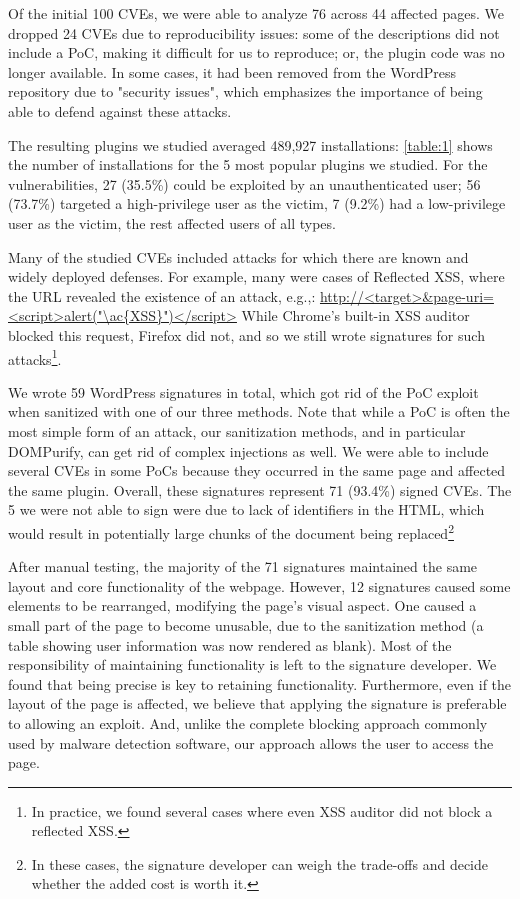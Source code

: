 Of the initial 100 CVEs, we were able to analyze 76 across 44 affected
pages. We dropped 24 CVEs due to reproducibility issues: some of the
descriptions did not include a PoC, making it difficult for us to
reproduce; or, the plugin code was no longer available. In some cases,
it had been removed from the WordPress repository due to "security
issues", which emphasizes the importance of being able to defend
against these attacks. %

The resulting plugins we studied averaged 489,927
installations: \autoref{table:1} shows the number of installations for
the 5 most popular plugins we studied. For the vulnerabilities, 27
(35.5\%) could be exploited by an unauthenticated user; 56 (73.7\%)
targeted a high-privilege user as the victim, 7 (9.2\%) had a
low-privilege user as the victim, the rest affected users of all
types.

Many of the studied CVEs included attacks for which there are known
and widely deployed defenses. For example, many were cases of
Reflected \ac{XSS}, where the URL revealed the existence of an attack,
e.g.,: \url{http://<target>&page-uri=<script>alert("\ac{XSS}")</script>}
While Chrome's built-in \ac{XSS} auditor blocked this request, Firefox
did not, and so we still wrote signatures for such attacks\footnote{In
practice, we found several cases where even XSS auditor did not block
a reflected XSS.}.

We wrote 59 WordPress signatures in total, which got rid of the PoC
exploit when sanitized with one of our three methods. Note that while
a PoC is often the most simple form of an attack, our sanitization
methods, and in particular DOMPurify, can get rid of complex
injections as well. We were able to include several CVEs in some PoCs
because they occurred in the same page and affected the same
plugin. Overall, these signatures represent 71 (93.4\%) signed
CVEs. The 5 we were not able to sign were due to lack of identifiers
in the HTML, which would result in potentially large chunks of the
document being replaced\footnote{In these cases, the signature developer
can weigh the trade-offs and decide whether the added cost is worth
it.}

After manual testing, the majority of the 71 signatures maintained the
same layout and core functionality of the webpage. However, 12
signatures caused some elements to be rearranged, modifying the page's
visual aspect. One caused a small part of the page to become unusable,
due to the sanitization method (a table showing user information
was now rendered as blank). Most of the responsibility of maintaining
functionality is left to the signature developer. We found that being precise
is key to retaining functionality. Furthermore, even if the layout of the page is
affected, we believe that applying the signature is preferable
to allowing an exploit. And, unlike the complete blocking approach commonly used by malware
detection software, our approach allows the user to access the page.

